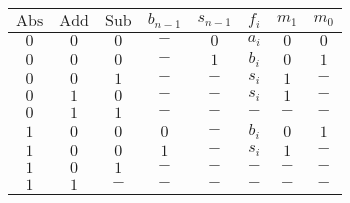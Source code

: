 \begin{tabular}{ccccc|c|cc}
$\mbox{Abs}$&$\mbox{Add}$&$\mbox{Sub}$&$b_{n-1}$&$s_{n-1}$&$f_i$&$m_1$&$m_0$\\\hline
$0$&$0$&$0$&$-$&$0$&$a_i$&$0$&$0$\\
$0$&$0$&$0$&$-$&$1$&$b_i$&$0$&$1$\\
$0$&$0$&$1$&$-$&$-$&$s_i$&$1$&$-$\\
$0$&$1$&$0$&$-$&$-$&$s_i$&$1$&$-$\\
$0$&$1$&$1$&$-$&$-$&$-$&$-$&$-$\\
$1$&$0$&$0$&$0$&$-$&$b_i$&$0$&$1$\\
$1$&$0$&$0$&$1$&$-$&$s_i$&$1$&$-$\\
$1$&$0$&$1$&$-$&$-$&$-$&$-$&$-$\\
$1$&$1$&$-$&$-$&$-$&$-$&$-$&$-$
\end{tabular}
